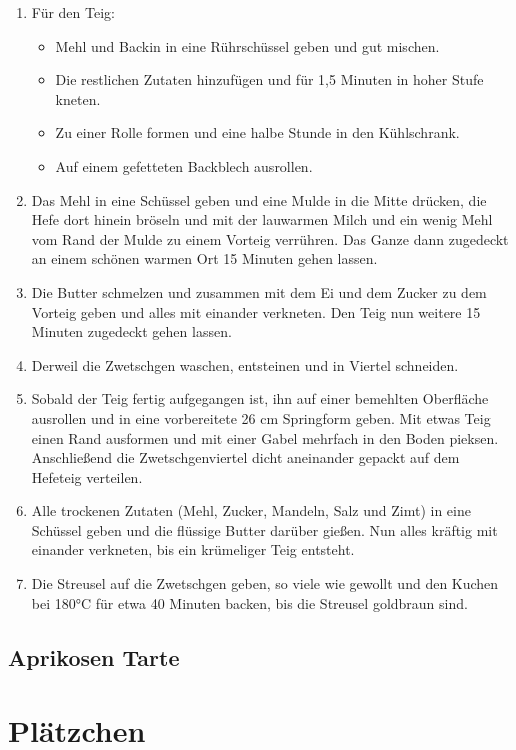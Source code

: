 \begin{enumerate}
    \item Für den Teig:
    \begin{itemize}
        \item Mehl und Backin in eine Rührschüssel geben und gut mischen.
        \item Die restlichen Zutaten hinzufügen und für 1,5 Minuten in hoher Stufe kneten.
        \item Zu einer Rolle formen und eine halbe Stunde in den Kühlschrank.
        \item Auf einem gefetteten Backblech ausrollen.
    \end{itemize}
    \item Das Mehl in eine Schüssel geben und eine Mulde in die Mitte drücken, die Hefe dort hinein bröseln und mit der lauwarmen Milch und ein wenig Mehl vom Rand der Mulde zu einem Vorteig verrühren. Das Ganze dann zugedeckt an einem schönen warmen Ort 15 Minuten gehen lassen.
    \item Die Butter schmelzen und zusammen mit dem Ei und dem Zucker zu dem Vorteig geben und alles mit einander verkneten. Den Teig nun weitere 15 Minuten zugedeckt gehen lassen.
    \item Derweil die Zwetschgen waschen, entsteinen und in Viertel schneiden.
    \item Sobald der Teig fertig aufgegangen ist, ihn auf einer bemehlten Oberfläche ausrollen und in eine vorbereitete 26 cm Springform geben. Mit etwas Teig einen Rand ausformen und mit einer Gabel mehrfach in den Boden pieksen. Anschließend die Zwetschgenviertel dicht aneinander gepackt auf dem Hefeteig verteilen.
    \item Alle trockenen Zutaten (Mehl, Zucker, Mandeln, Salz und Zimt) in eine Schüssel geben und die flüssige Butter darüber gießen. Nun alles kräftig mit einander verkneten, bis ein krümeliger Teig entsteht.
    \item Die Streusel auf die Zwetschgen geben, so viele wie gewollt und den Kuchen bei 180°C für etwa 40 Minuten backen, bis die Streusel goldbraun sind.
\end{enumerate}

\section{Aprikosen Tarte} 

\chapter{Plätzchen}


